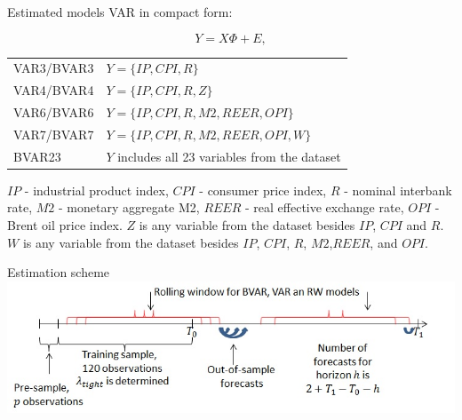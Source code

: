 \documentclass{beamer} %
\begin{document}
\begin{frame}{Estimated models} %
VAR in compact  form:

\begin{equation}
Y=X\Phi+E,\label{var}
\end{equation}
\begin{center}
\begin{tabular}{p{2.5cm}l}
\toprule
VAR3/BVAR3&$Y=\lbrace IP, CPI, R \rbrace$\\
VAR4/BVAR4 &$Y=\lbrace IP, CPI, R, Z\rbrace$ \\
VAR6/BVAR6& $Y=\lbrace IP, CPI, R, M2, REER, OPI \rbrace$ \\
VAR7/BVAR7&$Y=\lbrace IP, CPI, R, M2, REER, OPI, W \rbrace$\\
BVAR23&$Y$ includes all 23 variables from the dataset\\
\bottomrule
\end{tabular}
\end{center}
$IP$ - industrial product index, $CPI$ - consumer price index, $R$ - nominal interbank rate, $M2$ - monetary aggregate M2, $REER$ - real effective exchange rate, $OPI$ - Brent oil price index. $Z$ is any variable from the dataset besides $IP$, $CPI$ and $R$.  $W$ is any variable from the dataset besides $IP$, $CPI$, $R$, $M2$,$REER$, and $OPI$.
\end{frame}

\begin{frame}{Estimation scheme}%
 \hspace*{-0.9cm}
\includegraphics[scale=0.65]{estimation_scheme2.jpg}
\end{frame}
\end{document}
